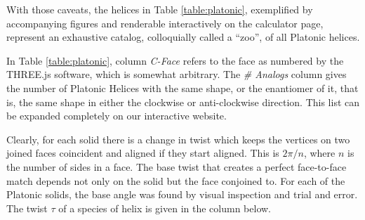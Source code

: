 \documentclass[11pt]{article}
\begin{document}
{With those caveats, the helices in Table \ref{table:platonic}, exemplified by
accompanying figures and renderable
interactively on the calculator page, represent an exhaustive catalog,
colloquially called a ``zoo'', of all Platonic helices.

In Table \ref{table:platonic}, column {\em C-Face} refers to the
face as numbered by the THREE.js software\cite{dirksen2013learning},
which is somewhat arbitrary. The {\em \# Analogs}
column gives the number of Platonic Helices with the same shape, or the enantiomer of it,
that is, the same
shape in either the clockwise or anti-clockwise direction.
This list can be expanded completely on our interactive website.

Clearly, for each solid there is a change in twist which keeps the vertices on
two joined faces coincident and
aligned if they start aligned. This is $2\pi/n$,
where $n$ is the number of sides in a face. The base twist that creates
a perfect face-to-face match depends not only on the solid but the face conjoined to.
For each of the Platonic
solids, the base angle was found by visual inspection and trial and error.
The twist $\tau$ of a species
of helix is given in the column below.

}
\end{document}
